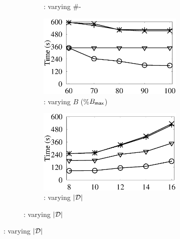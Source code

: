 \begin{figure}[tb!]
\begin{subfigure}[b]{1.00\textwidth}
\begin{subfigure}[b]{0.256\textwidth}
          \begin{center}
            \vspace{-2ex}\caption{\tpch: varying \#-}
            \label{tpch-1-vary-join} 
          \end{center}
          \vspace{-1ex}
        \end{subfigure}
        \hspace{-2.8ex}
  		\begin{subfigure}[b]{0.256\textwidth}
          \centering
          \includegraphics[width=1\textwidth]{fig/vary_b_tpch.eps}
          \begin{center}
            \vspace{-2ex}\caption{\tpch: varying $B$ (\%$B_{\protect\mathsf{max}}$)}
            \label{tpch-1-varyB} 
          \end{center}
          \vspace{-1ex}
        \end{subfigure}
        \hspace{-2.8ex}
  		\begin{subfigure}[b]{0.256\textwidth}
          \centering
          \includegraphics[width=1\textwidth]{fig/vary_d_tpch.eps}
          \begin{center}
            \vspace{-2ex}\caption{\tpch: varying $|\mathcal D|$}
            \label{tpch-1-varyD} 
          \end{center}
          \vspace{-1ex}
        \end{subfigure}


\end{subfigure}
\end{figure}
